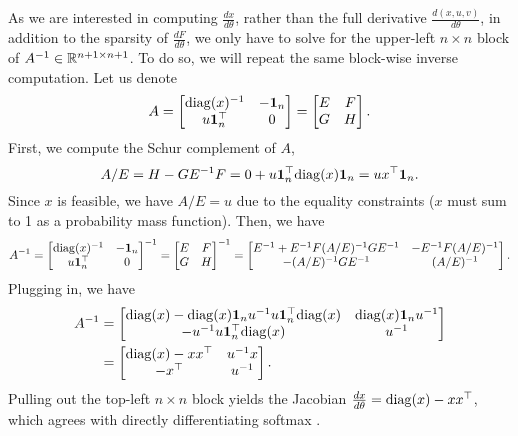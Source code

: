 \documentclass[11pt]{article}
\begin{document}
As we are interested in computing $\frac{dx}{d\theta}$,
rather than the full derivative $\frac{d(x,u,v)}{d\theta}$,
in addition to the sparsity of $\frac{dF}{d\theta}$, 
we only have to solve for the upper-left $n\times n$ block of $A^{-1}\in\mathbb{R}^{n+1\times n+1}$.
To do so, we will repeat the same block-wise inverse computation.
Let us denote
$$A
= \begin{bmatrix} \mathrm{diag}(x)^{-1} & -\mathbf{1}_n \\ u\mathbf{1}_n^\top & 0 \end{bmatrix}
= \begin{bmatrix}E & F \\ G & H\end{bmatrix}.
$$
First, we compute the Schur complement of $A$,
\begin{equation}
A/E = H - GE^{-1}F = 0 + u\mathbf{1}_n^\top\mathrm{diag}(x)\mathbf{1}_n = ux^\top\mathbf{1}_n.
\end{equation}
Since $x$ is feasible, we have $A/E = u$ due to the equality constraints
($x$ must sum to 1 as a probability mass function).
Then, we have
\begin{equation}
A^{-1} = \begin{bmatrix}
\mathrm{diag}(x)^{-1} & -\mathbf{1}_n\\
u\mathbf{1}^\top_n & 0
\end{bmatrix}^{-1}
=\begin{bmatrix}E & F \\ G & H\end{bmatrix}^{-1}
= \begin{bmatrix}
E^{-1} + E^{-1}F(A/E)^{-1}GE^{-1} & -E^{-1}F(A/E)^{-1}\\
-(A/E)^{-1}GE^{-1} & (A/E)^{-1}
\end{bmatrix}.
\end{equation}
Plugging in, we have
\begin{equation}
\begin{aligned}
A^{-1} 
&= \begin{bmatrix}
\mathrm{diag}(x) - \mathrm{diag}(x)\mathbf{1}_nu^{-1}u\mathbf{1}^\top_n\mathrm{diag}(x)
    & \mathrm{diag}(x)\mathbf{1}_nu^{-1}\\
-u^{-1}u\mathbf{1}^\top_n \mathrm{diag}(x) & u^{-1}
\end{bmatrix}\\
&= \begin{bmatrix}
\mathrm{diag}(x) - xx^\top
    & u^{-1}x\\
    -x^\top & u^{-1}
\end{bmatrix}.
\end{aligned}
\end{equation}
Pulling out the top-left $n\times n$ block yields
the Jacobian $\frac{d x}{d\theta} = \mathrm{diag}(x) - xx^\top$,
which agrees with directly differentiating softmax \citep{sparsemax}.
\end{document}
